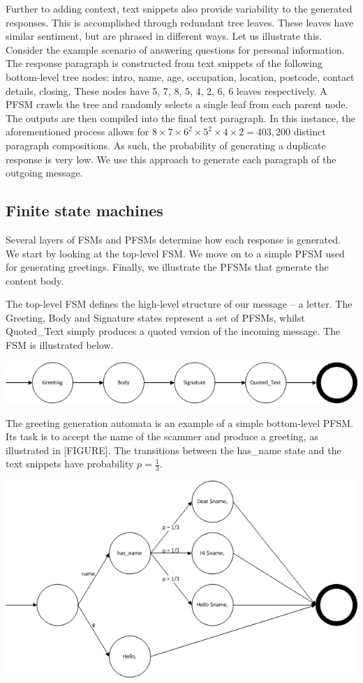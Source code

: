 Further to adding context, text snippets also provide variability to the generated responses. This is accomplished through redundant tree leaves. These leaves have similar sentiment, but are phrased in different ways. Let us illustrate this. Consider the example scenario of answering questions for personal information. The response paragraph is constructed from text snippets of the following bottom-level tree nodes: intro, name, age, occupation, location, postcode, contact details, closing. These nodes have 5, 7, 8, 5, 4, 2, 6, 6 leaves respectively. A PFSM crawls the tree and randomly selects a single leaf from each parent node. The outputs are then compiled into the final text paragraph. In this instance, the aforementioned process allows for $8 \times 7 \times 6^2 \times 5 ^ 2 \times 4 \times 2 = 403,200$ distinct paragraph compositions. As such, the probability of generating a duplicate response is very low. We use this approach to generate each paragraph of the outgoing message.

\subsection{Finite state machines}

Several layers of FSMs and PFSMs determine how each response is generated. We start by looking at the top-level FSM. We move on to a simple PFSM used for generating greetings. Finally, we illustrate the PFSMs that generate the content body.

The top-level FSM defines the high-level structure of our message -- a letter. The Greeting, Body and Signature states represent a set of PFSMs, whilst Quoted\_Text simply produces a quoted version of the incoming message. The FSM is illustrated below.

\includegraphics[scale=0.80]{fsm-top-level.png}

The greeting generation automata is an example of a simple bottom-level PFSM. Its task is to accept the name of the scammer and produce a greeting, as illustrated in [FIGURE]. The transitions between the has\_name state and the text snippets have probability $p = \frac{1}{3}$.

\includegraphics[scale=0.60]{pfsm-greeting.png}

